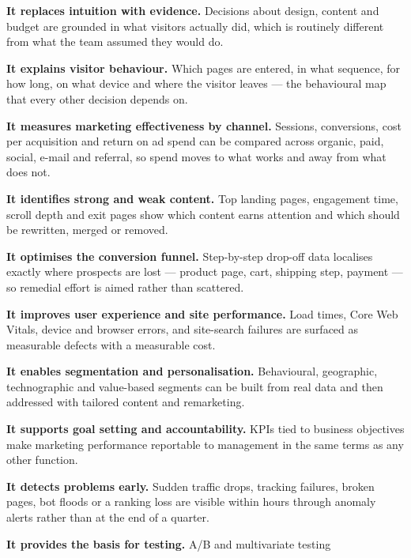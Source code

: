 \begin{qlist}
\begin{apts}
\item \textbf{It replaces intuition with evidence.} Decisions about design,
      content and budget are grounded in what visitors actually did, which is
      routinely different from what the team assumed they would do.
\item \textbf{It explains visitor behaviour.} Which pages are entered, in what
      sequence, for how long, on what device and where the visitor leaves ---
      the behavioural map that every other decision depends on.
\item \textbf{It measures marketing effectiveness by channel.} Sessions,
      conversions, cost per acquisition and return on ad spend can be compared
      across organic, paid, social, e-mail and referral, so spend moves to what
      works and away from what does not.
\item \textbf{It identifies strong and weak content.} Top landing pages,
      engagement time, scroll depth and exit pages show which content earns
      attention and which should be rewritten, merged or removed.
\item \textbf{It optimises the conversion funnel.} Step-by-step drop-off data
      localises exactly where prospects are lost --- product page, cart,
      shipping step, payment --- so remedial effort is aimed rather than
      scattered.
\item \textbf{It improves user experience and site performance.} Load times,
      Core Web Vitals, device and browser errors, and site-search failures are
      surfaced as measurable defects with a measurable cost.
\item \textbf{It enables segmentation and personalisation.} Behavioural,
      geographic, technographic and value-based segments can be built from real
      data and then addressed with tailored content and remarketing.
\item \textbf{It supports goal setting and accountability.} KPIs tied to
      business objectives make marketing performance reportable to management
      in the same terms as any other function.
\item \textbf{It detects problems early.} Sudden traffic drops, tracking
      failures, broken pages, bot floods or a ranking loss are visible within
      hours through anomaly alerts rather than at the end of a quarter.
\item \textbf{It provides the basis for testing.} A/B and multivariate testing

\end{apts}
\end{qlist}

